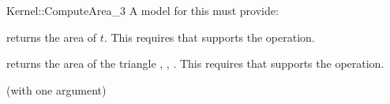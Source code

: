 \begin{ccRefFunctionObjectConcept}{Kernel::ComputeArea_3}
A model for this must provide:


       {returns the area of $t$. This requires that 
        supports the  operation.}

{returns the area of the triangle , , .
This requires that  supports the  operation. }

\ccRefines
{} (with one argument)

\ccSeeAlso
{}\\

\end{ccRefFunctionObjectConcept}
